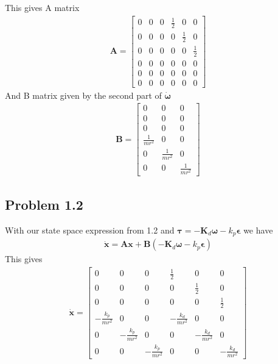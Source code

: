 This gives A matrix
\begin{align}
    \boldsymbol{A} = 
    \begin{bmatrix}
    0 & 0 & 0 & \frac{1}{2} & 0 & 0 \\
    0 & 0 & 0 & 0 & \frac{1}{2} & 0 \\
    0 & 0 & 0 & 0 & 0 & \frac{1}{2} \\
    0 & 0 & 0 & 0 & 0 & 0 \\
    0 & 0 & 0 & 0 & 0 & 0 \\
    0 & 0 & 0 & 0 & 0 & 0 
    \end{bmatrix}
\end{align}
And B matrix given by the second part of $\boldsymbol{\dot{\omega}}$ 
\begin{align}
\boldsymbol{B} = 
\begin{bmatrix}
    0 & 0 & 0 \\
    0 & 0 & 0 \\
    0 & 0 & 0 \\
    \frac{1}{mr^2} & 0 & 0 \\
    0 & \frac{1}{mr^2} & 0 \\
    0 & 0 & \frac{1}{mr^2} 
\end{bmatrix}
\end{align}

\subsection*{Problem 1.2}

With our state space expression from 1.2 and $\boldsymbol{\tau} = -\boldsymbol{K}_d\boldsymbol{\omega} - k_p\boldsymbol{\epsilon}$ we have
\begin{align}
    \boldsymbol{\dot{x}} = \boldsymbol{A}\boldsymbol{x} + \boldsymbol{B}(-\boldsymbol{K}_d\boldsymbol{\omega} - k_p\boldsymbol{\epsilon})
\end{align}
This gives
\begin{align}
    \boldsymbol{\dot{x}} = 
    \begin{bmatrix}
    0 & 0 & 0 & \frac{1}{2} & 0 & 0 \\
    0 & 0 & 0 & 0 & \frac{1}{2} & 0 \\
    0 & 0 & 0 & 0 & 0 & \frac{1}{2} \\
    -\frac{k_p}{mr^2} & 0 & 0 & -\frac{k_d}{mr^2} & 0 & 0 \\
    0 & -\frac{k_p}{mr^2} & 0 & 0 & -\frac{k_d}{mr^2} & 0 \\
    0 & 0 & -\frac{k_p}{mr^2} & 0 & 0 & -\frac{k_d}{mr^2}
    \end{bmatrix}
\end{align}

